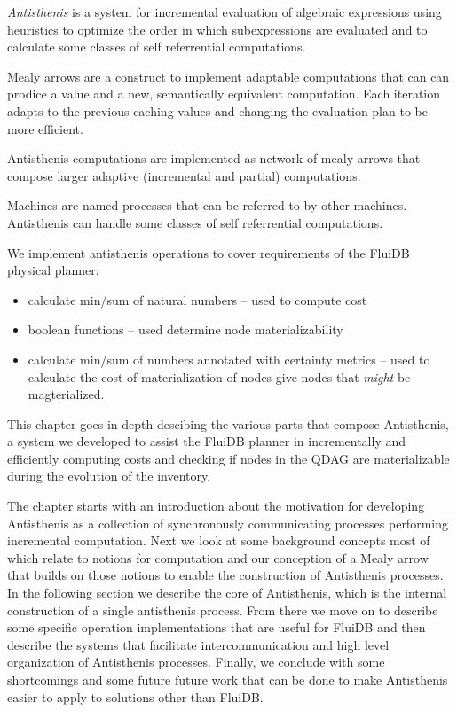 
\begin{summary}
\item \emph{Antisthenis} is a system for incremental evaluation of
  algebraic expressions using heuristics to optimize the order in
  which subexpressions are evaluated and to calculate some classes of
  self referrential computations.
\item Mealy arrows are a construct to implement adaptable computations
  that can can prodice a value and a new, semantically equivalent
  computation. Each iteration adapts to the previous caching values
  and changing the evaluation plan to be more efficient.
\item Antisthenis computations are implemented as network of mealy
  arrows that compose larger adaptive (incremental and partial)
  computations.
\item Machines are named processes that can be referred to by other
  machines. Antisthenis can handle some classes of self referrential
  computations.
\item We implement antisthenis operations to cover requirements of the
  FluiDB physical planner:

  \begin{itemize}
  \item calculate min/sum of natural numbers -- used to compute cost
  \item boolean functions -- used determine node materializability
  \item calculate min/sum of numbers annotated with certainty metrics
    -- used to calculate the cost of materialization of nodes give
    nodes that \emph{might} be magterialized.
  \end{itemize}
\end{summary}

This chapter goes in depth descibing the various parts that compose
Antisthenis, a system we developed to assist the FluiDB planner in
incrementally and efficiently computing costs and checking if nodes in
the QDAG are materializable during the evolution of the inventory.

The chapter starts with an introduction about the motivation for
developing Antisthenis as a collection of synchronously communicating
processes performing incremental computation. Next we look at some
background concepts most of which relate to notions for computation
and our conception of a Mealy arrow that builds on those notions to
enable the construction of Antisthenis processes. In the following
section we describe the core of Antisthenis, which is the internal
construction of a single antisthenis process. From there we move on to
describe some specific operation implementations that are useful for
FluiDB and then describe the systems that facilitate
intercommunication and high level organization of Antisthenis
processes. Finally, we conclude with some shortcomings and some future
future work that can be done to make Antisthenis easier to apply to
solutions other than FluiDB.

